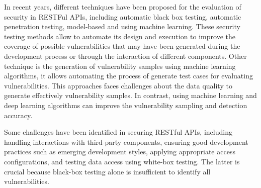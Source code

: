 In recent years, different techniques have been proposed for the evaluation of security in RESTFul APIs, including automatic black box testing\cite{Corradini2023}, automatic penetration testing\cite{Auricchio2022}, model-based\cite{EMEKA2023} and using machine learning\cite{Ghanem2019,Hu2020,Schwartz2019}. These security testing methods allow to automate its design and execution to improve the coverage of possible vulnerabilities that may have been generated during the development process or through the interaction of different components. Other technique is the generation of vulnerability samples using machine learning algorithms\cite{Nong2022GeneratigFV}, it allows automating the process of generate test cases for evaluating vulnerabilities. This approaches faces challenges about the data quality to generate effectively vulnerability samples. In contrast, using machine learning and deep learning algorithms can improve the vulnerability sampling and detection accuracy.

Some challenges have been identified in securing RESTful APIs\cite{zhong2023}, including handling interactions with third-party components, ensuring good development practices such as emerging development styles, applying appropriate access configurations, and testing data access using white-box testing. The latter is crucial because black-box testing alone is insufficient to identify all vulnerabilities.

